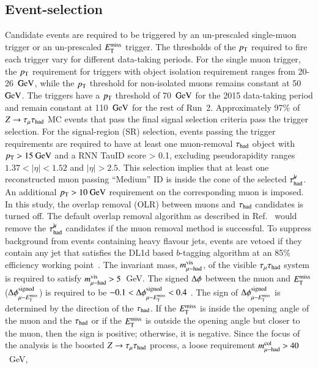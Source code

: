     \subsection{Event-selection} \label{sec:ZttSelection}
        Candidate events are required to be triggered by an un-prescaled single-muon trigger or an un-prescaled $E_{\text{T}}^{\text{miss}}$ trigger.
        The thresholds of the $p_{\text{T}}$ required to fire each trigger vary for different data-taking periods. For the single muon trigger,
        the $p_{\text{T}}$ requirement for triggers with object isolation requirement ranges from 20-26~$\text{GeV}$, while the $p_{\text{T}}$ threshold for non-isolated muons remains constant at 50~$\text{GeV}$. 
        The \MET triggers have a $p_{\text{T}}$ threshold of 70~$\text{GeV}$ for the 2015 data-taking period and remain constant at 110~$\text{GeV}$ for the rest of Run~2. 
        Approximately 97\% of  $Z\rightarrow\tau_\mathrm{\mu}\tau_{\text{had}}$ MC events that pass the final signal selection criteria pass the trigger selection.
        For the signal-region (SR) selection, events passing the trigger requirements are required 
        to have at least one muon-removal $\tau_{\text{had}}$ object with $p_{\text{T}} > 15~\text{GeV}$ and a RNN TauID score > 0.1, 
        excluding pseudorapidity ranges $1.37 < |\eta| < 1.52$ and $|\eta| > 2.5$. This selection 
        implies that at least one reconstructed muon passing ``Medium'' ID is inside the cone of the selected 
        $\tau_\mathrm{had}^{\mu\mkern-10mu\backslash}$. An additional $p_{\text{T}} > 10~\text{GeV}$ requirement on the corresponding muon is imposed. 
        In this study, the overlap removal (OLR) between muons and $\tau_{\text{had}}$ candidates is turned off. 
        The default overlap removal algorithm as described in Ref.~\cite{HIGG-2019-09} would remove 
        the $\tau_\mathrm{had}^{\mu\mkern-10mu\backslash}$ candidates if the muon removal method is successful. 
        To suppress background from events containing heavy flavour jets, events are vetoed if they 
        contain any jet that satisfies the DL1d based $b$-tagging algorithm at an 85\% efficiency working point~\cite{FTAG-2019-07}.
        The invariant mass, $m_{\mu\mathrm{-}\mathrm{had}}^\mathrm{vis}$, of the visible $\tau_\mathrm{\mu}\tau_\mathrm{had}$ system is required to satisfy $m_{\mu\mathrm{-}\mathrm{had}}^\mathrm{vis} > 5$~GeV. 
        The signed $\Delta \phi$ between the muon and $E_{\text{T}}^{\text{miss}}$ ($\Delta \phi_{\mu\mathrm{-}E_{\text{T}}^{\text{miss}}}^\mathrm{signed}$) is required to be $-0.1 < \Delta \phi_{\mu\mathrm{-}E_{\text{T}}^{\text{miss}}}^\mathrm{signed} < 0.4$ . 
        The sign of $\Delta \phi_{\mu\mathrm{-}E_{\text{T}}^{\text{miss}}}^\mathrm{signed}$ is determined by the direction of the $\tau_{\text{had}}$. 
        If the $E_{\text{T}}^{\text{miss}}$ is inside the opening angle of the muon and the $\tau_{\text{had}}$ or if the $E_{\text{T}}^{\text{miss}}$ is outside 
        the opening angle but closer to the muon, then the sign is positive; otherwise, it is negative. 
        Since the focus of the analysis is the boosted $Z\rightarrow\tau_\mathrm{\mu}\tau_{\text{had}}$ process, a loose requirement $m_{\mu\mathrm{-}\mathrm{had}}^\mathrm{col} > 40$~GeV, 
